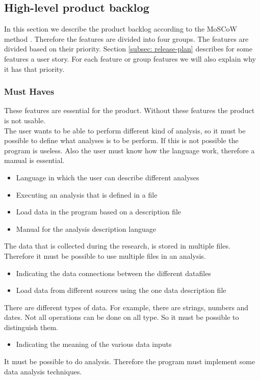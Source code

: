 \subsection{High-level product backlog}
\label{subsec: MoSCoW}
In this section we describe the product backlog according to the MoSCoW method \cite{moscowref}. Therefore the features are divided into four groups. The features are divided based on their priority. Section \ref{subsec: release-plan} describes for some features a user story. For each feature or group features we will also explain why it has that priority.
\subsubsection{Must Haves}
These features are essential for the product. Without these features the product is not usable. \\
The user wants to be able to perform different kind of analysis, so it must be possible to define what analyses is to be perform. If this is not possible the program is useless. Also the user must know how the language work, therefore a manual is essential.
\begin{itemize}
  \item Language in which the user can describe different analyses
  \item Executing an analysis that is defined in a file
  \item Load data in the program based on a description file
  \item Manual for the analysis description language
\end{itemize}
The data that is collected during the research, is stored in multiple files. Therefore it must be possible to use multiple files in an analysis.
\begin{itemize}
  \item Indicating the data connections between the different datafiles
  \item Load data from different sources using the one data description file
\end{itemize}
There are different types of data. For example, there are strings, numbers and dates. Not all operations can be done on all type. So it must be possible to distinguish them.
\begin{itemize}
  \item Indicating the meaning of the various data inputs
\end{itemize}
It must be possible to do analysis. Therefore the program must implement some data analysis techniques.
